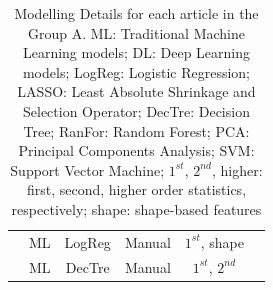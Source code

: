 \documentclass{article}
\begin{document}
\begin{table}[]
\begin{tabular}{cccccc}
        \cite{Tu2020}                       & ML                             & LogReg                                         & Manual                        & $1^{st}$, shape                    \\
        \cite{Romeo2018}                    & ML                             & DecTre                                         & Manual                        & $1^{st}$, $2^{nd}$                 \\
        \bottomrule
    \end{tabular}
    \caption{Modelling Details  for each article in the Group A. ML: Traditional Machine Learning models; DL: Deep Learning models; LogReg: Logistic Regression; LASSO: Least Absolute Shrinkage and Selection Operator; DecTre: Decision Tree; RanFor: Random Forest; PCA: Principal Components Analysis; SVM: Support Vector Machine; $1^{st}$, $2^{nd}$, higher: first, second, higher order statistics, respectively; shape: shape-based features}
    \label{tab:model_A}
\end{table}
\end{document}
